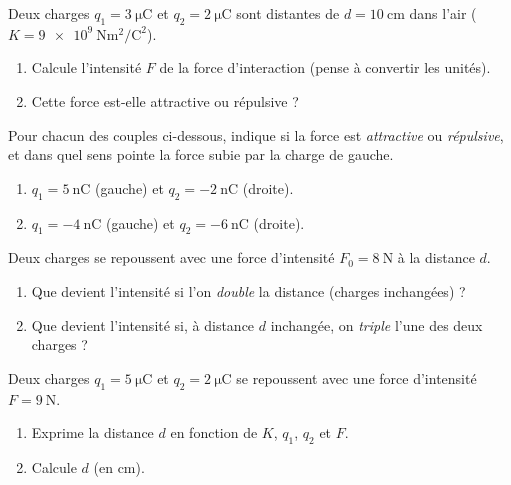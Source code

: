 \documentclass[11pt,a4paper]{article}
\begin{document}

\begin{exo}
Deux charges $q_1 = \SI{+3}{\micro\coulomb}$ et $q_2 = \SI{+2}{\micro\coulomb}$ sont distantes de
$d = \SI{10}{\centi\metre}$ dans l'air ($K = \num{9e9}\ \si{\newton\metre\squared\per\coulomb\squared}$).
\begin{enumerate}[label=\alph*)]
  \item Calcule l'intensité $F$ de la force d'interaction (pense à convertir les unités).
  \item Cette force est-elle attractive ou répulsive ?
\end{enumerate}
\end{exo}

\begin{exo}
Pour chacun des couples ci-dessous, indique si la force est \emph{attractive} ou \emph{répulsive},
et dans quel sens pointe la force subie par la charge de gauche.
\begin{enumerate}[label=\alph*)]
  \item $q_1 = \SI{+5}{\nano\coulomb}$ (gauche) et $q_2 = \SI{-2}{\nano\coulomb}$ (droite).
  \item $q_1 = \SI{-4}{\nano\coulomb}$ (gauche) et $q_2 = \SI{-6}{\nano\coulomb}$ (droite).
\end{enumerate}
\end{exo}

\begin{exo}
Deux charges se repoussent avec une force d'intensité $F_0 = \SI{8}{\newton}$ à la distance $d$.
\begin{enumerate}[label=\alph*)]
  \item Que devient l'intensité si l'on \emph{double} la distance (charges inchangées) ?
  \item Que devient l'intensité si, à distance $d$ inchangée, on \emph{triple} l'une des deux
        charges ?
\end{enumerate}
\end{exo}

\begin{exo}
Deux charges $q_1 = \SI{+5}{\micro\coulomb}$ et $q_2 = \SI{+2}{\micro\coulomb}$ se repoussent avec
une force d'intensité $F = \SI{9}{\newton}$.
\begin{enumerate}[label=\alph*)]
  \item Exprime la distance $d$ en fonction de $K$, $q_1$, $q_2$ et $F$.
  \item Calcule $d$ (en cm).
\end{enumerate}
\end{exo}
\end{document}
